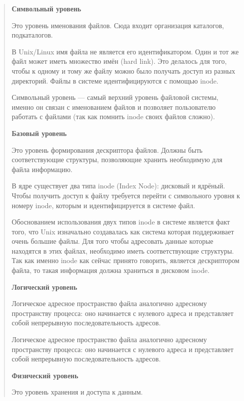 \begin{quote}
\textbf{Символьный уровень}

Это уровень именования файлов. Сюда входит организация каталогов, подкаталогов.

В Unix/Linux имя файла не является его идентификатором. Один и тот же файл может иметь множество имён (hard link). Это делалось для того, чтобы к одному и тому же файлу можно было получать доступ из разных директорий. Файлы в системе идентифицируются с помощью inode.

Символьный уровень — самый верхний уровень файловой системы, именно он связан с именованием файлов и позволяет пользователю работать с файлами (так как помнить inode своих файлов сложно).

\textbf{Базовый уровень}


Это уровень формирования дескриптора файлов. Должны быть соответствующие структуры, позволяющие хранить необходимую для файла информацию.

В ядре существует два типа inode (Index Node): дисковый и ядрёный. Чтобы получить доступ к файлу требуется перейти с символьного уровня к номеру inode, которым и идентифицируется в системе файл.

Обоснованием использования двух типов inode в системе является факт того, что Unix изначально создавалась как система которая поддерживает очень большие файлы. Для того чтобы адресовать данные которые находятся в этих файлах, необходимо иметь соответствующие структуры. Так как именно inode как сейчас принято говорить, является дескриптором файла, то такая информация должна храниться в дисковом inode.

\textbf{Логический уровень}

Логическое адресное пространство файла аналогично адресному пространству процесса: оно начинается с нулевого адреса и представляет собой непрерывную последовательность адресов.

Логическое адресное пространство файла аналогично адресному пространству процесса: оно начинается с нулевого адреса и представляет собой непрерывную последовательность адресов.

\textbf{Физический уровень}

Это уровень хранения и доступа к данным.

\end{quote}

